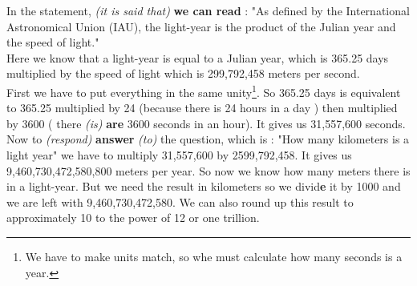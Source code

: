 \documentclass[12pt,a4paper,english,firamath]{nsi}
\begin{document}
\maketitle
In the statement, \textit{(it is said that)} \textbf{we can read} : "As defined by the International Astronomical Union (IAU), the light-year is the product of the Julian year and the speed of light."\\

Here we know that a light-year is equal to a Julian year, which is 365.25 days multiplied by the speed of light which is 299,792,458 meters per second.\\

First we have to put everything in the same unity\footnote{We have to make units match, so whe must calculate how many seconds is a year.}. So 365.25 days is equivalent to 365.25 multiplied by 24 (because there is 24 hours in a day ) then multiplied by 3600 ( there \textit{(is)} \textbf{are} 3600 seconds in an hour). It gives us 31,557,600 seconds.\\

Now to \textit{(respond)} \textbf{answer}  \textit{(to)} the question, which is : "How many kilometers is a light year" we have to multiply 31,557,600 by 2599,792,458. It gives us 9,460,730,472,580,800 meters per year. So now we know how many meters there is in a light-year. But we need the result in kilometers so we divid\textbf{e}  it by 1000 and we are left with 9,460,730,472,580. We can also round up this result to approximately 10 to the power of 12 or one trillion.
\end{document}

